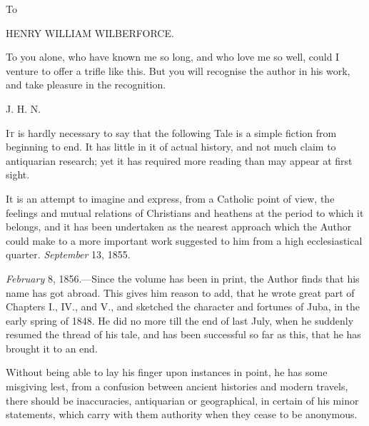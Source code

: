 



To


HENRY WILLIAM WILBERFORCE.



To you alone, who have known me so long, and who love me so well,
could I venture to offer a trifle like this. But you will recognise
the author in his work, and take pleasure in the recognition.


J. H. N.













I\textsc{t} is hardly necessary to say that the following Tale is
a simple fiction from beginning to end. It has little in it of actual
history, and not much claim to antiquarian research; yet it has required
more reading than may appear at first sight.


It is an attempt to imagine and express, from a Catholic
point of view, the feelings and mutual relations of Christians and
heathens at the period to which it belongs, and it has been undertaken
as the nearest approach which the Author could make to a more important
work suggested to him from a high ecclesiastical quarter.
\emph{September} 13, 1855.










\emph{February} 8, 1856.—Since the volume has been in
print, the Author finds that his name has got abroad. This gives him
reason to add, that he wrote great part of Chapters I., IV., and V., and
sketched the character and fortunes of Juba, in the early spring of
1848. He did no more till the end of last July, when he suddenly resumed
the thread of his tale, and has been successful so far as this, that he
has brought it to an end.


Without being able to lay his finger upon instances in
point, he has some misgiving lest, from a confusion between ancient
histories and modern travels, there should be inaccuracies, antiquarian
or geographical, in certain of his minor statements, which carry with
them authority when they cease to be anonymous.


